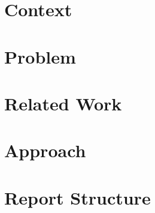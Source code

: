 \section{Context}
\section{Problem}
\section{Related Work}
\section{Approach}
\section{Report Structure}
